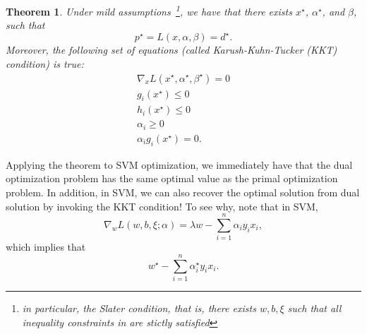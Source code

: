 \documentclass{article}
\newtheorem{theorem}{Theorem}
\newtheorem{lemma}{Lemma}
\DeclareMathOperator*{\Ical}{{\cal I}}
\DeclareMathOperator*{\minimize}{{\rm minimize}}
\DeclareMathOperator*{\st}{{\rm s.t.}}
\newcommand{\inner}[2]{\left\langle #1,#2 \right\rangle}
\begin{document}
\begin{theorem}
  Under mild assumptions~\footnote{in particular, the Slater condition, that is, there exists $w,b,\xi$ such that all inequality constraints in are stictly satisfied}, we have that there exists $x^\star$, $\alpha^\star$, and $\beta$, such that
  \[ p^\star = L(x, \alpha, \beta) = d^\star. \]
  Moreover, the following set of equations (called Karush-Kuhn-Tucker (KKT) condition) is true:
  \begin{eqnarray*}
    \nabla_x L(x^\star,\alpha^\star,\beta^\star) = 0 \\
    g_i(x^\star) \leq 0 \\
    h_i(x^\star) \leq 0 \\
    \alpha_i \geq 0 \\
    \alpha_i g_i(x^\star) = 0.
  \end{eqnarray*}
\end{theorem}

Applying the theorem to SVM optimization, we immediately have that the dual optimization problem has the same optimal value as the primal optimization problem.
In addition, in SVM, we can also recover the optimal solution from dual solution by invoking the KKT condition! To see why, note that in SVM,
\[ \nabla_w L(w,b,\xi;\alpha) = \lambda w - \sum_{i=1}^n \alpha_i y_i x_i, \]
which implies that
\[ w^\star - \sum_{i=1}^n \alpha_i^\star y_i x_i. \]



\end{document}
